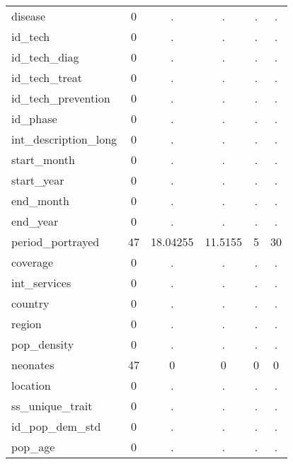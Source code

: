 \begin{table}[htbp]
\begin{tabular}{l*{1}{ccccc}}
disease     &           0&           .&           .&           .&           .\\
id\_tech     &           0&           .&           .&           .&           .\\
id\_tech\_diag&           0&           .&           .&           .&           .\\
id\_tech\_treat&           0&           .&           .&           .&           .\\
id\_tech\_prevention&           0&           .&           .&           .&           .\\
id\_phase    &           0&           .&           .&           .&           .\\
int\_description\_long&           0&           .&           .&           .&           .\\
start\_month &           0&           .&           .&           .&           .\\
start\_year  &           0&           .&           .&           .&           .\\
end\_month   &           0&           .&           .&           .&           .\\
end\_year    &           0&           .&           .&           .&           .\\
period\_portrayed&          47&    18.04255&     11.5155&           5&          30\\
coverage    &           0&           .&           .&           .&           .\\
int\_services&           0&           .&           .&           .&           .\\
country     &           0&           .&           .&           .&           .\\
region      &           0&           .&           .&           .&           .\\
pop\_density &           0&           .&           .&           .&           .\\
neonates    &          47&           0&           0&           0&           0\\
location    &           0&           .&           .&           .&           .\\
ss\_unique\_trait&           0&           .&           .&           .&           .\\
id\_pop\_dem\_std&           0&           .&           .&           .&           .\\
pop\_age     &           0&           .&           .&           .&           .\\

\end{tabular}
\end{table}
